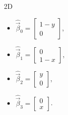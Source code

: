 \begin{table}[!ht]
    \centering
    2D
    \begin{multicols}{4}
    \begin{itemize}
        \item[] \(\hat{\vec{\beta}}_0 = \begin{bmatrix}1 - y \\ 0\end{bmatrix}\),
        \item[] \(\hat{\vec{\beta}}_1 = \begin{bmatrix}0 \\ 1 - x\end{bmatrix}\),
        \item[] \(\hat{\vec{\beta}}_2 = \begin{bmatrix}y \\ 0\end{bmatrix}\),
        \item[] \(\hat{\vec{\beta}}_3 = \begin{bmatrix}0 \\ x\end{bmatrix}\).
    \end{itemize}
    \end{multicols}
    
    \vspace{0.5cm}
    

\end{table}
